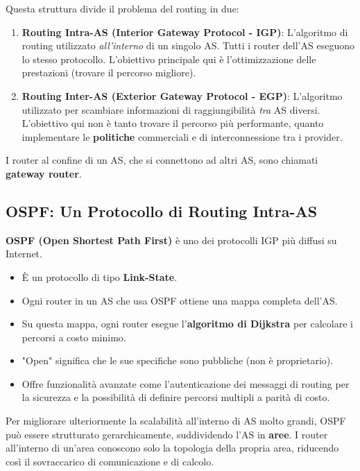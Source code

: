 Questa struttura divide il problema del routing in due:
\begin{enumerate}
    \item \textbf{Routing Intra-AS (Interior Gateway Protocol - IGP)}: L'algoritmo di routing utilizzato \textit{all'interno} di un singolo AS. Tutti i router dell'AS eseguono lo stesso protocollo. L'obiettivo principale qui è l'ottimizzazione delle prestazioni (trovare il percorso migliore).
    \item \textbf{Routing Inter-AS (Exterior Gateway Protocol - EGP)}: L'algoritmo utilizzato per scambiare informazioni di raggiungibilità \textit{tra} AS diversi. L'obiettivo qui non è tanto trovare il percorso più performante, quanto implementare le \textbf{politiche} commerciali e di interconnessione tra i provider.
\end{enumerate}

I router al confine di un AS, che si connettono ad altri AS, sono chiamati \textbf{gateway router}.

\subsection{OSPF: Un Protocollo di Routing Intra-AS}
\textbf{OSPF (Open Shortest Path First)} è uno dei protocolli IGP più diffusi su Internet.
\begin{itemize}
    \item È un protocollo di tipo \textbf{Link-State}.
    \item Ogni router in un AS che usa OSPF ottiene una mappa completa dell'AS.
    \item Su questa mappa, ogni router esegue l'\textbf{algoritmo di Dijkstra} per calcolare i percorsi a costo minimo.
    \item "Open" significa che le sue specifiche sono pubbliche (non è proprietario).
    \item Offre funzionalità avanzate come l'autenticazione dei messaggi di routing per la sicurezza e la possibilità di definire percorsi multipli a parità di costo.
\end{itemize}

Per migliorare ulteriormente la scalabilità all'interno di AS molto grandi, OSPF può essere strutturato gerarchicamente, suddividendo l'AS in \textbf{aree}. I router all'interno di un'area conoscono solo la topologia della propria area, riducendo così il sovraccarico di comunicazione e di calcolo.

